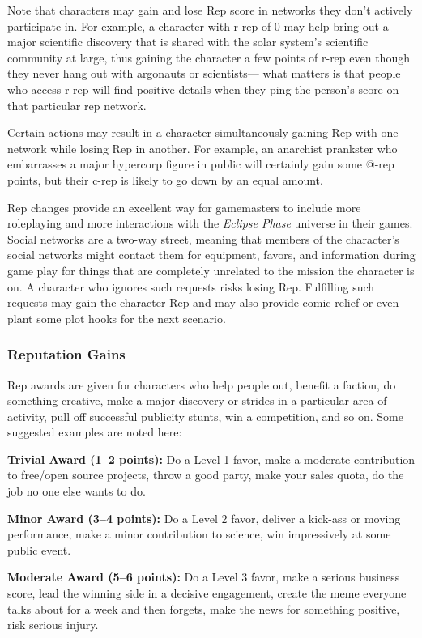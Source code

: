 Note that characters may gain and lose Rep score 
in networks they don't actively participate in. For 
example, a character with r-rep of 0 may help bring 
out a major scientific discovery that is shared with the 
solar system's scientific community at large, thus gaining
the character a few points of r-rep even though
they never hang out with argonauts or scientists—
what matters is that people who access r-rep will find 
positive details when they ping the person's score on 
that particular rep network. 

Certain actions may result in a character simultaneously
gaining Rep with one network while losing
Rep in another. For example, an anarchist prankster 
who embarrasses a major hypercorp figure in public 
will certainly gain some @-rep points, but their c-rep 
is likely to go down by an equal amount.

Rep changes provide an excellent way for gamemasters
to include more roleplaying and more interactions
with the \textit{Eclipse Phase} universe in their games. Social 
networks are a two-way street, meaning that members 
of the character's social networks might contact them 
for equipment, favors, and information during game 
play for things that are completely unrelated to the 
mission the character is on. A character who ignores 
such requests risks losing Rep. Fulfilling such requests 
may gain the character Rep and may also provide 
comic relief or even plant some plot hooks for the 
next scenario.

\subsubsection{Reputation Gains}

Rep awards are given for characters who help people 
out, benefit a faction, do something creative, make 
a major discovery or strides in a particular area of 
activity, pull off successful publicity stunts, win a 
competition, and so on. Some suggested examples are 
noted here:

\textbf{Trivial Award (1–2 points):} Do a Level 1 favor, 
make a moderate contribution to free/open source 
projects, throw a good party, make your sales quota, 
do the job no one else wants to do. 

\textbf{Minor Award (3–4 points):} Do a Level 2 favor, deliver
a kick-ass or moving performance, make a minor
contribution to science, win impressively at some 
public event.

\textbf{Moderate Award (5–6 points):} Do a Level 3 favor, 
make a serious business score, lead the winning side 
in a decisive engagement, create the meme everyone 
talks about for a week and then forgets, make the 
news for something positive, risk serious injury.

